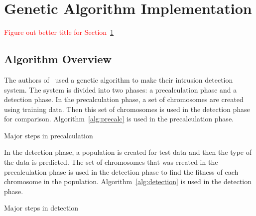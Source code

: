 \documentclass{sig-alternate}
\newcommand{\mycomment}[1]{\textcolor{red}{#1}}
\begin{document}
\section{Genetic Algorithm Implementation}
\label{sec:genAlgImp}
\mycomment{Figure out better title for Section~\ref{sec:genAlgImp}}

\subsection{Algorithm Overview}
The authors of~\cite{DBLP:journals/corr/abs-1204-1336} used a genetic algorithm to make their intrusion detection system. The system is divided into two phases: a precalculation phase and a detection phase. In the precalculation phase, a set of chromosomes are created using training data. Then this set of chromosomes is used in the detection phase for comparison. Algorithm~\ref{alg:precalc} is used in the precalculation phase.

\begin{algorithm}
\caption{Major steps in precalculation}
\label{alg:precalc}
\begin{algorithmic}
  \ELSE {}
  \ENDIF
\ENDFOR
\end{algorithmic}
\end{algorithm}

In the detection phase, a population is created for test data and then the type of the data is predicted. The set of chromosomes that was created in the precalculation phase is used in the detection phase to find the fitness of each chromosome in the population. Algorithm~\ref{alg:detection} is used in the detection phase.

\begin{algorithm}
\caption{Major steps in detection}
\label{alg:detection}
\begin{algorithmic}
    \ENDFOR
  \ENDFOR
\ENDWHILE
\end{algorithmic}
\end{algorithm}
\end{document}
